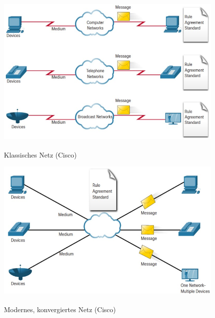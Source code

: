 \begin{figure}[H]
    \begin{center}
    \label{pic:converging_classic}
    \includegraphics[width=.6\textwidth]{images/converging_network_classic.jpg}
    \caption{Klassisches Netz (\textsuperscript{\textcopyright}Cisco)}
    \end{center}
\end{figure}
\begin{figure}[H]
    \begin{center}
    \label{pic:converging_modern}
    \includegraphics[width=.6\textwidth]{images/converging_network_modern.jpg}
    \caption{Modernes, konvergiertes Netz (\textsuperscript{\textcopyright}Cisco)}
    \end{center}
\end{figure}

